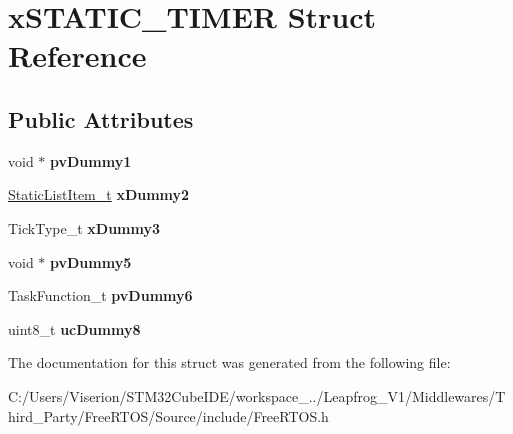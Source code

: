 \hypertarget{structx_s_t_a_t_i_c___t_i_m_e_r}{}\section{x\+S\+T\+A\+T\+I\+C\+\_\+\+T\+I\+M\+ER Struct Reference}
\label{structx_s_t_a_t_i_c___t_i_m_e_r}
\subsection*{Public Attributes}
\begin{DoxyCompactItemize}
\item 
\mbox{\label{structx_s_t_a_t_i_c___t_i_m_e_r_a040499298faced6032f84f3a33c785fd}} 
void $\ast$ {\bfseries pv\+Dummy1}
\item 
\mbox{\label{structx_s_t_a_t_i_c___t_i_m_e_r_a622e2e596e5829c9197bb44b9009474f}} 
\mbox{\hyperlink{structx_s_t_a_t_i_c___l_i_s_t___i_t_e_m}{Static\+List\+Item\+\_\+t}} {\bfseries x\+Dummy2}
\item 
\mbox{\label{structx_s_t_a_t_i_c___t_i_m_e_r_a60d582d1d0b5b9b15e8050d5ae29bc30}} 
Tick\+Type\+\_\+t {\bfseries x\+Dummy3}
\item 
\mbox{\label{structx_s_t_a_t_i_c___t_i_m_e_r_a5150821e9535f86547aafbfc50d44423}} 
void $\ast$ {\bfseries pv\+Dummy5}
\item 
\mbox{\label{structx_s_t_a_t_i_c___t_i_m_e_r_ac0d22064153fd2394380a61528d3c705}} 
Task\+Function\+\_\+t {\bfseries pv\+Dummy6}
\item 
\mbox{\label{structx_s_t_a_t_i_c___t_i_m_e_r_a36a702a7e0e2fec558c8264ff3d88e93}} 
uint8\+\_\+t {\bfseries uc\+Dummy8}
\end{DoxyCompactItemize}


The documentation for this struct was generated from the following file\+:\begin{DoxyCompactItemize}
\item 
C\+:/\+Users/\+Viserion/\+S\+T\+M32\+Cube\+I\+D\+E/workspace\+\_../\+Leapfrog\+\_\+\+V1/\+Middlewares/\+Third\+\_\+\+Party/\+Free\+R\+T\+O\+S/\+Source/include/Free\+R\+T\+O\+S.\+h\end{DoxyCompactItemize}
